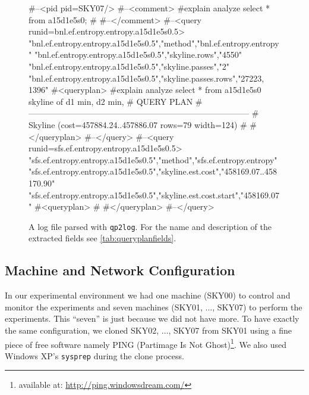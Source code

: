 \begin{figure}[htbp]
\begin{interactive}
#--<pid pid=SKY07/>
#--<comment>
#explain analyze select * from a15d1e5s0;
# \ellipsis{}
#--</comment>
#--<query runid=bnl.ef.entropy.entropy.a15d1e5s0.5>\commentskip
{}
"bnl.ef.entropy.entropy.a15d1e5s0.5","method","bnl.ef.entropy.entropy"
\ellipsis
"bnl.ef.entropy.entropy.a15d1e5s0.5","skyline.rows","4550"
"bnl.ef.entropy.entropy.a15d1e5s0.5","skyline.passes","2"
"bnl.ef.entropy.entropy.a15d1e5s0.5","skyline.passes.rows","27223, 1396"
\ellipsis\commentskip
{}
#<queryplan>
#explain analyze select * from a15d1e5s0 skyline of d1 min, d2 min, \ellipsis
#                                    QUERY PLAN
#--------------------------------------------------------------------------------
# Skyline  (cost=457884.24..457886.07 rows=79 width=124)
# \ellipsis{}
#</queryplan>
#--</query>
#--<query runid=sfs.ef.entropy.entropy.a15d1e5s0.5>
"sfs.ef.entropy.entropy.a15d1e5s0.5","method","sfs.ef.entropy.entropy"
"sfs.ef.entropy.entropy.a15d1e5s0.5","skyline.est.cost","458169.07..458170.90"
"sfs.ef.entropy.entropy.a15d1e5s0.5","skyline.est.cost.start","458169.07"
\ellipsis{}
#<queryplan>
# \ellipsis{}
#</queryplan>
#--</query>
\end{interactive}
\caption{A log file parsed with \texttt{qp2log}.  For the name and description of the extracted fields see \autoref{tab:queryplanfields}.}
\label{fig:parsedlogfile}
\end{figure}

\subsection{Machine and Network Configuration}
In our experimental environment we had one machine (SKY00) to control
and monitor the experiments and seven machines (SKY01, $\ldots$,
SKY07) to perform the experiments.
This ``seven'' is just because we did not have more.
%
To have exactly the same configuration, we cloned SKY02, $\ldots$, SKY07 from
SKY01 using a fine piece of free software namely PING (Partimage Is
Not Ghost)\footnote{available at: \url{http://ping.windowsdream.com/}}.
We also used Windows XP's \texttt{sysprep} during the clone process.

